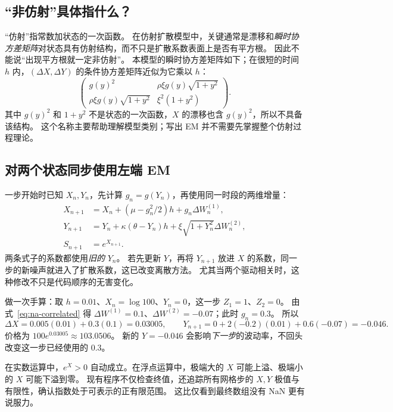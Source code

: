 \subsection{“非仿射”具体指什么？}
“仿射”指常数加状态的一次函数。
在仿射扩散模型中，关键通常是漂移和\emph{瞬时协方差矩阵}对状态具有仿射结构，而不只是扩散系数表面上是否有平方根。
因此不能说“出现平方根就一定非仿射”。
本模型的瞬时协方差矩阵如下；在很短的时间 $h$ 内，$(\Delta X,\Delta Y)$ 的条件协方差矩阵近似为它乘以 $h$：
\begin{equation}\label{eq:na-cov-matrix}
 \begin{pmatrix}
  g(y)^2 & \rho\xi g(y)\sqrt{1+y^2}\\
  \rho\xi g(y)\sqrt{1+y^2} & \xi^2(1+y^2)
 \end{pmatrix}.
\end{equation}
其中 $g(y)^2$ 和 $1+y^2$ 不是状态的一次函数，$X$ 的漂移也含 $g(y)^2$，所以不具备该结构。
这个名称主要帮助理解模型类别；写出 EM 并不需要先掌握整个仿射过程理论。

\subsection{对两个状态同步使用左端 EM}
一步开始时已知 $X_n,Y_n$，先计算 $g_n=g(Y_n)$，再使用同一时段的两维增量：
\begin{align}
 X_{n+1}&=X_n+(\mu-g_n^2/2)h+g_n\Delta W_n^{(1)},\label{eq:na-em-x}\\
 Y_{n+1}&=Y_n+\kappa(\theta-Y_n)h+\xi\sqrt{1+Y_n^2}\Delta W_n^{(2)},\label{eq:na-em-y}\\
 S_{n+1}&=e^{X_{n+1}}.\label{eq:na-em-s}
\end{align}
两条式子的系数都使用\emph{旧的} $Y_n$。
若先更新 $Y$，再将 $Y_{n+1}$ 放进 $X$ 的系数，同一步的新噪声就进入了扩散系数，这已改变离散方法。
尤其当两个驱动相关时，这种修改不只是代码顺序的无害变化。

做一次手算：取 $h=0.01$、$X_n=\log100$、$Y_n=0$，这一步 $Z_1=1$、$Z_2=0$。
由式~\eqref{eq:na-correlated} 得 $\Delta W^{(1)}=0.1$、$\Delta W^{(2)}=-0.07$；此时 $g_n=0.3$。
所以
\begin{equation}\label{eq:na-hand-step}
 \Delta X=0.005(0.01)+0.3(0.1)=0.03005,\qquad
 Y_{n+1}=0+2(-0.2)(0.01)+0.6(-0.07)=-0.046.
\end{equation}
价格为 $100e^{0.03005}\approx103.0506$。
新的 $Y=-0.046$ 会影响\emph{下一步}的波动率，不回头改变这一步已经使用的 $0.3$。

在实数运算中，$e^X>0$ 自动成立。在浮点运算中，极端大的 $X$ 可能上溢、极端小的 $X$ 可能下溢到零。
现有程序不仅检查终值，还追踪所有网格步的 $X,Y$ 极值与有限性，确认指数处于可表示的正有限范围。
这比仅看到最终数组没有 NaN 更有说服力。

